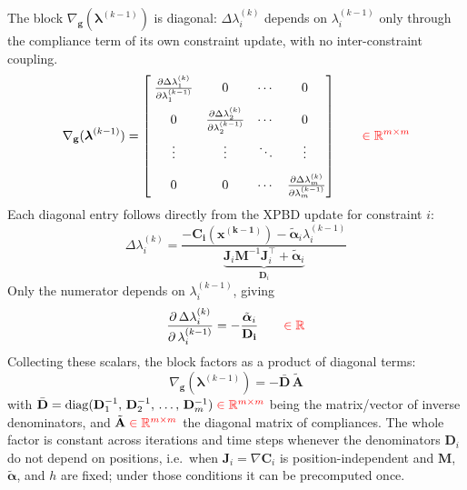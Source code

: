 \documentclass{article}
\newcommand{\pd}[2]{\dfrac{\partial\, #1}{\partial\, #2}}
\newcommand{\pdc}[2]{\frac{\partial #1}{\partial #2}}
\newcommand{\red}[1]{\textcolor{red}{#1}}
\begin{document}
The block $\nabla_\mathbf{g}(\boldsymbol{\lambda}^{(k-1)})$ is diagonal:
$\Delta\lambda_i^{(k)}$ depends on $\lambda_i^{(k-1)}$ only through the
compliance term of its own constraint update, with no inter-constraint
coupling.
\begin{equation}
\nabla_\mathbf{g}(\boldsymbol{\lambda}^{(k-1)}) =
\begin{bmatrix}
    \;\pdc{\Delta \lambda_1^{(k)}}{\lambda_1^{(k-1)}} &0 &\cdots &0\; \\[2ex]
    \;0 &\pdc{\Delta \lambda_2^{(k)}}{\lambda_2^{(k-1)}} &\cdots &0\; \\[2ex]
    \;\vdots &\vdots &\ddots &\vdots\; \\[2ex]
    \; 0 &0 &\cdots &\pdc{\Delta \lambda_m^{(k)}}{\lambda_m^{(k-1)}}
\end{bmatrix}    
\qquad \red{\in \mathbb{R}^{m \times m}}
\end{equation}
Each diagonal entry follows directly from the XPBD update for constraint $i$:
\begin{equation*}
    \Delta \lambda_i^{(k)} = 
    \frac{-\mathbf{C_i(\mathbf{x}^{(k-1)})} - \tilde{\boldsymbol{\alpha}}_i\lambda_i^{(k-1)}}
    {\underbrace{\mathbf{J}_i\mathbf{M}^{-1}\mathbf{J}_i^\top + \tilde{\boldsymbol{\alpha}}_i}_{\mathbf{D}_i}}
\end{equation*}
Only the numerator depends on $\lambda_i^{(k-1)}$, giving
\begin{equation}
    \pd{\Delta \lambda_i^{(k)}}{\lambda_i^{(k-1)}} = 
    -\frac{\tilde{\boldsymbol{\alpha}}_i}{\mathbf{D_i}} 
    \qquad \red{\in \mathbb{R}} 
\end{equation}
Collecting these scalars, the block factors as a product of diagonal terms:
\begin{equation}
    \nabla_\mathbf{g}(\boldsymbol{\lambda}^{(k-1)}) =
    - \bar{\mathbf{D}}\,\tilde{\mathbf{A}}
\end{equation}
with $\bar{\mathbf{D}} = \operatorname{diag}(\mathbf{D}_1^{-1},\, \mathbf{D}_2^{-1},\, \dots,\, \mathbf{D}_m^{-1})\; \red{\in \mathbb{R}^{m \times m}}$ being the matrix/vector of inverse denominators, and $\tilde{\mathbf{A}}\; \red{\in \mathbb{R}^{m\times m}}$ the diagonal matrix of compliances. The whole factor is constant across iterations and time steps whenever the denominators $\mathbf{D}_i$ do not depend on positions, i.e.\ when $\mathbf{J}_i = \nabla \mathbf{C}_i$ is position-independent and $\mathbf{M}$, $\tilde{\boldsymbol{\alpha}}$, and $h$ are fixed; under those conditions it can be precomputed once.
\end{document}
